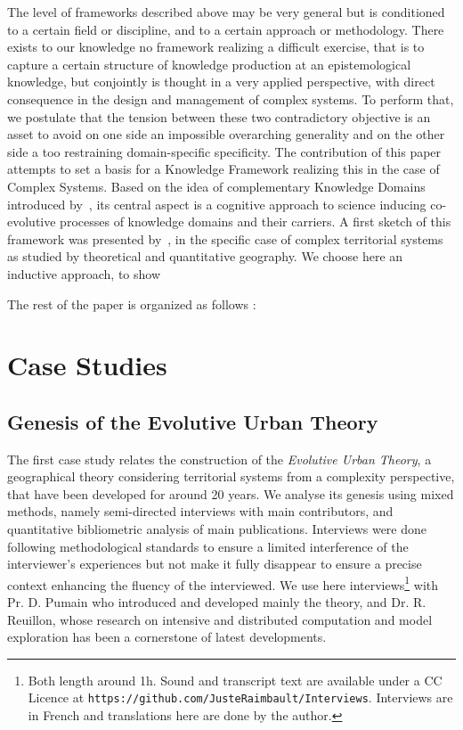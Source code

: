 \documentclass[runningheads,a4paper]{llncs2e/llncs}
\begin{document}
The level of frameworks described above may be very general but is conditioned to a certain field or discipline, and to a certain approach or methodology. There exists to our knowledge no framework realizing a difficult exercise, that is to capture a certain structure of knowledge production at an epistemological knowledge, but conjointly is thought in a very applied perspective, with direct consequence in the design and management of complex systems. To perform that, we postulate that the tension between these two contradictory objective is an asset to avoid on one side an impossible overarching generality and on the other side a too restraining domain-specific specificity. The contribution of this paper attempts to set a basis for a Knowledge Framework realizing this in the case of Complex Systems. Based on the idea of complementary Knowledge Domains introduced by~\cite{livet2010}, its central aspect is a cognitive approach to science inducing co-evolutive processes of knowledge domains and their carriers. A first sketch of this framework was presented by~\cite{raimbault:halshs-01505084}, in the specific case of complex territorial systems as studied by theoretical and quantitative geography. We choose here an inductive approach, to show


The rest of the paper is organized as follows : 




\section{Case Studies}


\subsection{Genesis of the Evolutive Urban Theory}

The first case study relates the construction of the \emph{Evolutive Urban Theory}, a geographical theory considering territorial systems from a complexity perspective, that have been developed for around 20 years. We analyse its genesis using mixed methods, namely semi-directed interviews with main contributors, and quantitative bibliometric analysis of main publications. Interviews were done following methodological standards \cite{legavre1996neutralite} to ensure a limited interference of the interviewer's experiences but not make it fully disappear to ensure a precise context enhancing the fluency of the interviewed. We use here interviews\footnote{Both length around 1h. Sound and transcript text are available under a CC Licence at \texttt{https://github.com/JusteRaimbault/Interviews}. Interviews are in French and translations here are done by the author.} with Pr. D. Pumain who introduced and developed mainly the theory, and Dr. R. Reuillon, whose research on intensive and distributed computation and model exploration has been a cornerstone of latest developments.
\end{document}
